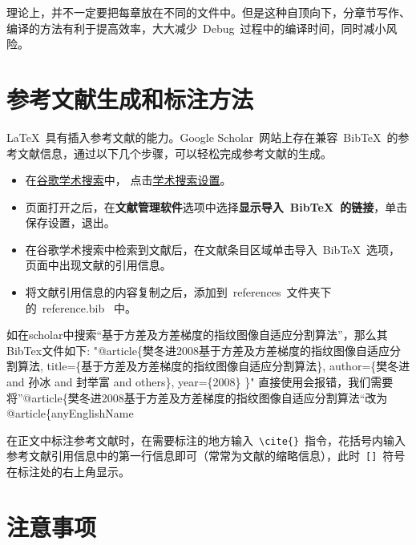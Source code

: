 理论上，并不一定要把每章放在不同的文件中。但是这种自顶向下，分章节写作、编译的方法有利于提高效率，大大减少~Debug~过程中的编译时间，同时减小风险。

\section{参考文献生成和标注方法}

\LaTeX~具有插入参考文献的能力。Google Scholar~网站上存在兼容~BibTeX~的参考文献信息，通过以下几个步骤，可以轻松完成参考文献的生成。
\begin{itemize}
  \item 在\href{http://scholar.google.com/}{谷歌学术搜索}中，
        点击\href{http://scholar.google.com/scholar_preferences?hl=en&as_sdt=0,5}{学术搜索设置}。
  \item 页面打开之后，在\textbf{文献管理软件}选项中选择\textbf{显示导入~BibTeX~的链接}，单击保存设置，退出。
  \item 在谷歌学术搜索中检索到文献后，在文献条目区域单击导入~BibTeX~选项，页面中出现文献的引用信息。
  \item 将文献引用信息的内容复制之后，添加到~references~文件夹下的~reference.bib~ 中。
\end{itemize}
\par{如在scholar中搜索“基于方差及方差梯度的指纹图像自适应分割算法”，那么其BibTex文件如下:
 "@article\{樊冬进2008基于方差及方差梯度的指纹图像自适应分割算法,
  title=\{基于方差及方差梯度的指纹图像自适应分割算法\},
  author=\{樊冬进 and 孙冰 and 封举富 and others\},
  year=\{2008\}
\}"
直接使用会报错，我们需要将”@article\{樊冬进2008基于方差及方差梯度的指纹图像自适应分割算法“改为@article\{anyEnglishName

}


在正文中标注参考文献时，在需要标注的地方输入~\verb|\cite{}|~指令，花括号内输入参考文献引用信息中的第一行信息即可（常常为文献的缩略信息），此时~\verb|[]|~符号在标注处的右上角显示。

\section{注意事项}

